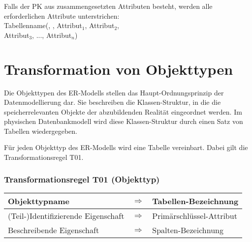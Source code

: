 Falls der PK aus zusammengesetzten Attributen besteht, werden alle erforderlichen Attribute unterstrichen:\\
\hspace*{12mm}Tabellenname(, , Attribut$_1$, Attribut$_2$,\\
\hspace*{40mm}Attribut$_3$, ..., Attribut$_n$)
\section{Transformation von Objekttypen}
Die Objekttypen des ER-Modells stellen das Haupt-Ordnungsprinzip der Datenmodellierung dar. Sie beschreiben die Klassen-Struktur, in die die speicherrelevanten Objekte der abzubildenden Realität eingeordnet werden. Im physischen Datenbankmodell wird diese Klassen-Struktur durch einen Satz von Tabellen wiedergegeben.

Für jeden Objekttyp des ER-Modells wird eine Tabelle vereinbart. Dabei gilt die Transformationsregel T01.
\subsubsection{Transformationsregel T01 (Objekttyp)}
\begin{supertabular}[h]{|l|l|p{7.5cm}|}
    \hline
    \footnotesize Objekttypname & $\Rightarrow$ & \footnotesize Tabellen-Bezeichnung\\
    \hline
    \footnotesize (Teil-)Identifizierende Eigenschaft & $\Rightarrow$ & \footnotesize Primärschlüssel-Attribut\\
    \hline
    \footnotesize Beschreibende Eigenschaft & $\Rightarrow$ & \footnotesize Spalten-Bezeichnung\\
    \hline
\end{supertabular}

\begin{center}
\end{center}
